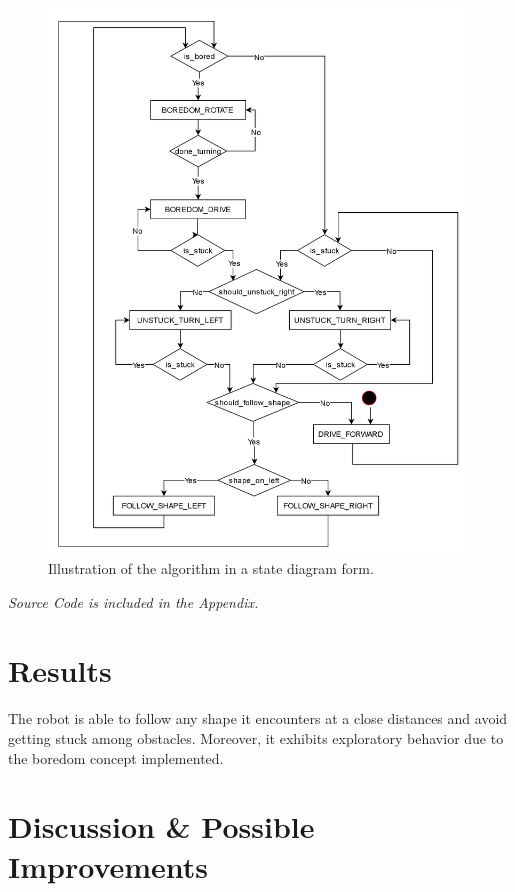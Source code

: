 \documentclass[11pt, a4paper]{article}
\begin{document}
\begin{figure}[h]
  \begin{center}
    \includegraphics[width=30em]{../assets/state-diagram.png}
    \caption{Illustration of the algorithm in a state diagram form.}
  \end{center}
\end{figure}

\begin{center}
  \emph{Source Code is included in the Appendix.}
\end{center}





\section{Results}

The robot is able to follow any shape it encounters at a close distances and 
avoid getting stuck among obstacles. Moreover, it exhibits exploratory behavior
due to the boredom concept implemented.


\section{Discussion \& Possible Improvements}
\end{document}
